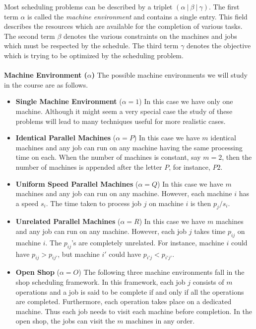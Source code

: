 \documentclass[11pt]{article}
\def\ni{\noindent}
\begin{document}
Most scheduling problems can be described by a triplet $(\alpha ~|~ \beta ~|~ \gamma )$. The first term $\alpha$ is called the {\em machine environment} and contains a single entry. This field describes the resources which are available for the completion of various tasks. The second term $\beta$ denotes the various constraints on the machines and jobs which must be respected by the schedule. The third term $\gamma$ denotes the objective which is trying to be optimized by the scheduling problem. \\
\\
\ni
{\bf Machine Environment ($\alpha$)} The possible machine environments we will study in the course are as follows.
\begin{itemize}
\item[] {\bf Single Machine Environment} ($\alpha=1$) In this case we have only one machine. Although it might seem a very special case the study of these problems will lead to many techniques useful for more realistic cases.

\item[]{\bf Identical Parallel Machines} ($\alpha = P$) In this case we have $m$ identical machines and any job can run on any machine having the same processing time on each. When the number of machines is constant, say $m=2$, then the number of machines is appended after the letter $P$, for instance, $P2$.

\item[]{\bf Uniform Speed Parallel Machines} ($\alpha = Q$) In this case we have $m$ machines and any job can run on any machine. However, each machine $i$ has a speed $s_i$. The time taken to process job $j$ on machine $i$ is then $p_j/s_i$.

\item[]{\bf Unrelated Parallel Machines} ($\alpha = R$) In this case we have $m$ machines and any job can run on any machine. However, each job $j$ takes time $p_{ij}$ on machine $i$. The $p_{ij}$'s are completely unrelated. For instance, machine $i$ could have $p_{ij} > p_{ij'}$, but machine $i'$ could have $p_{i'j} < p_{i'j'}$.

\item[]{\bf Open Shop} ($\alpha = O$) The following three machine environments fall in the shop scheduling framework. In this framework, each job $j$ consists of $m$ operations and a job is said to be complete if and only if all the operations are completed. Furthermore, each operation takes place on a dedicated machine. Thus each job needs to visit each machine before completion. In the open shop, the jobs can visit the $m$ machines in any order.


\end{itemize}
\end{document}
